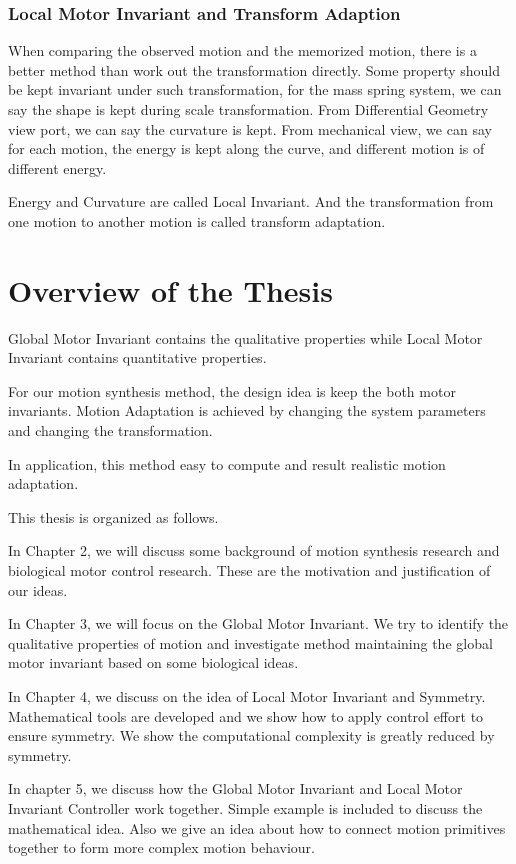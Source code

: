 \subsubsection*{Local Motor Invariant and Transform Adaption}
When comparing the observed motion and the memorized motion, there is a better method than work out the transformation directly. Some property should be kept invariant under such transformation, for the mass spring system, we can say the shape is kept during scale transformation. From Differential Geometry view port, we can say the curvature is kept. From mechanical view, we can say for each motion, the energy is kept along the curve, and different motion is of different energy. 

Energy and Curvature are called Local Invariant. And the transformation from one motion to another motion is called transform adaptation.



\section{Overview of the Thesis}
Global Motor Invariant contains the qualitative properties while Local Motor Invariant contains quantitative properties. 

For our motion synthesis method, the design idea is keep the both motor invariants. Motion Adaptation is achieved by changing the system parameters and changing the transformation.

In application, this method easy to compute and result realistic motion adaptation.



This thesis is organized as follows.
 
In Chapter 2, we will discuss some background of motion synthesis research and biological motor control research. These are the motivation and justification of our ideas.
 
In Chapter 3, we will focus on the Global Motor Invariant. We try to identify the qualitative properties of motion and investigate method maintaining the global motor invariant based on some biological ideas.

In Chapter 4, we discuss on the idea of Local Motor Invariant and Symmetry.
Mathematical tools are developed and we show how to apply control effort to ensure symmetry. We show the computational complexity is greatly reduced by symmetry.

In chapter 5, we discuss how the Global Motor Invariant and Local Motor Invariant Controller work together. Simple example is included to discuss the mathematical idea. Also we give an idea about how to connect motion primitives together to form more complex motion behaviour.

